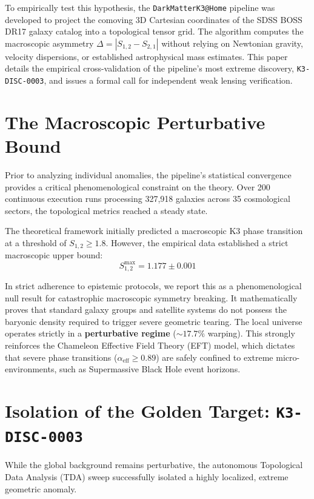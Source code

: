 \documentclass[aps,prd,twocolumn,nofootinbib,superscriptaddress,10pt]{revtex4-2}
\begin{document}
To empirically test this hypothesis, the \texttt{DarkMatterK3@Home} pipeline was developed to project the comoving 3D Cartesian coordinates of the SDSS BOSS DR17 galaxy catalog into a topological tensor grid. The algorithm computes the macroscopic asymmetry $\Delta = |S_{1,2} - S_{2,1}|$ without relying on Newtonian gravity, velocity dispersions, or established astrophysical mass estimates. This paper details the empirical cross-validation of the pipeline's most extreme discovery, \texttt{K3-DISC-0003}, and issues a formal call for independent weak lensing verification.

\section{The Macroscopic Perturbative Bound}

Prior to analyzing individual anomalies, the pipeline's statistical convergence provides a critical phenomenological constraint on the theory. Over 200 continuous execution runs processing 327,918 galaxies across 35 cosmological sectors, the topological metrics reached a steady state.

The theoretical framework initially predicted a macroscopic K3 phase transition at a threshold of $S_{1,2} \ge 1.8$. However, the empirical data established a strict macroscopic upper bound:
\begin{equation}
    S_{1,2}^{\text{max}} = 1.177 \pm 0.001
\end{equation}

In strict adherence to epistemic protocols, we report this as a phenomenological null result for catastrophic macroscopic symmetry breaking. It mathematically proves that standard galaxy groups and satellite systems do not possess the baryonic density required to trigger severe geometric tearing. The local universe operates strictly in a \textbf{perturbative regime} ($\sim 17.7\%$ warping). This strongly reinforces the Chameleon Effective Field Theory (EFT) model, which dictates that severe phase transitions ($\alpha_{\text{eff}} \ge 0.89$) are safely confined to extreme micro-environments, such as Supermassive Black Hole event horizons.

\section{Isolation of the Golden Target: \texttt{K3-DISC-0003}}

While the global background remains perturbative, the autonomous Topological Data Analysis (TDA) sweep successfully isolated a highly localized, extreme geometric anomaly. 
\end{document}
